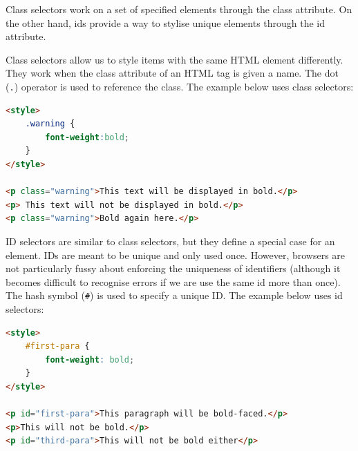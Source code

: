 \documentclass[a4paper, openany]{memoir}
\begin{document}
Class selectors work on a set of specified elements through the class attribute. On the other hand, ids provide a way to stylise unique elements through the id attribute.

Class selectors allow us to style items with the same HTML element differently. They work when the class attribute of an HTML tag is given a name. The dot (\texttt{.}) operator is used to reference the class. The example below uses class selectors:
\begin{lstlisting}[language=html]
<style>
    .warning {
        font-weight:bold;
    }
</style>

<p class="warning">This text will be displayed in bold.</p>
<p> This text will not be displayed in bold.</p>
<p class="warning">Bold again here.</p>
\end{lstlisting}

ID selectors are similar to class selectors, but they define a special case for an element. IDs are meant to be unique and only used once. However, browsers are not particularly fussy about enforcing the uniqueness of identifiers (although it becomes difficult to recognise errors if we are use the same id more than once). The hash symbol (\texttt{\#}) is used to specify a unique ID. The example below uses id selectors:
\begin{lstlisting}[language=html]
<style>
    #first-para {
        font-weight: bold;
    }
</style>

<p id="first-para">This paragraph will be bold-faced.</p>
<p>This will not be bold.</p>
<p id="third-para">This will not be bold either</p>
\end{lstlisting}
\end{document}
